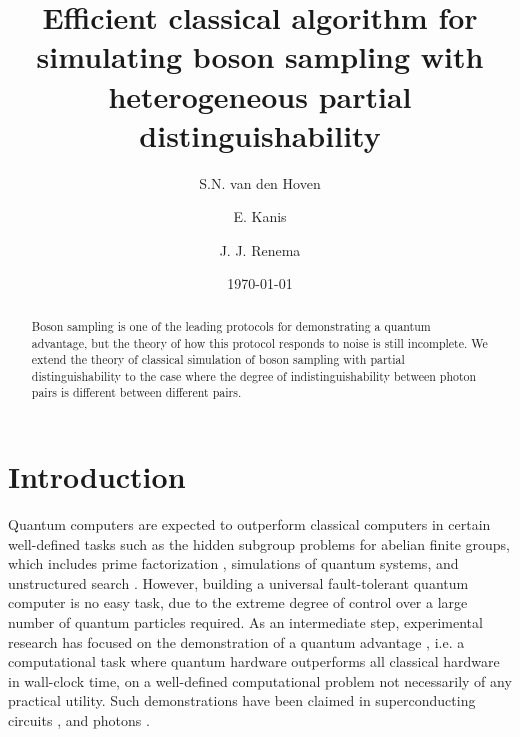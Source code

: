 \documentclass[10pt,aps,pra,twocolumn,superscriptaddress]{revtex4-2}
\begin{document}
\title{Efficient classical algorithm for simulating boson sampling with heterogeneous partial distinguishability}

\author{S.N. van den Hoven}

\author{E. Kanis}

\author{J. J. Renema}

\date{
	\today
}

\begin{abstract}
Boson sampling is one of the leading protocols for demonstrating a quantum advantage, but the theory of how this protocol responds to noise is still incomplete. We extend the theory of classical simulation of boson sampling with partial distinguishability to the case where the degree of indistinguishability between photon pairs is different between different pairs. 
\end{abstract}

\maketitle

\section{Introduction}
\label{sec:intro}
Quantum computers are expected to outperform classical computers in certain well-defined tasks such as the hidden subgroup problems for abelian finite groups, which includes prime factorization \cite{Shor_prime}, simulations of quantum systems\cite{seth_lloyd_simulating_quantum_sys}, and unstructured search \cite{Grovers_algorithm}.  However, building a universal fault-tolerant quantum computer is no easy task, due to the extreme degree of control over a large number of quantum particles required. As an intermediate step, experimental research has focused on the demonstration of a quantum advantage \cite{harrow2017}, i.e. a computational task where quantum hardware outperforms all classical hardware in wall-clock time, on a well-defined computational problem not necessarily of any practical utility. Such demonstrations have been claimed in superconducting circuits \cite{arute2019quantum, Wu2021, Zhu2022}, and photons \cite{zhong2020quantum, wang2019, zhong2021}. 
\end{document}
